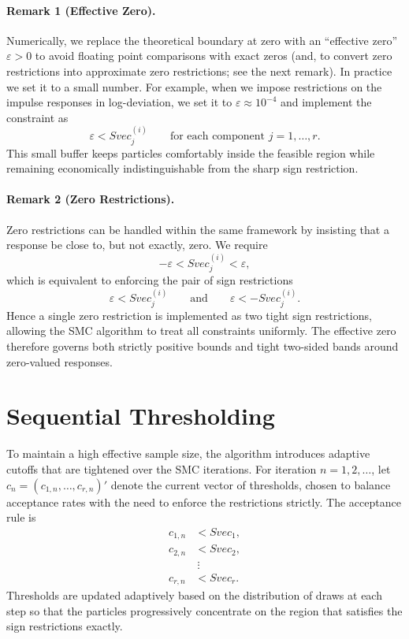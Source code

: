 \documentclass[11pt]{article}
\begin{document}
\paragraph{Remark 1 (Effective Zero).}
Numerically, we replace the theoretical boundary at zero with an ``effective zero'' $\varepsilon>0$ to avoid floating point comparisons with exact zeros (and, to convert zero restrictions into approximate zero restrictions; see the next remark). In practice we set it to a small number. For example, when we impose restrictions on the impulse responses in log-deviation, we set it to $\varepsilon \approx 10^{-4}$ and implement the constraint as
\[
\varepsilon < Svec^{(i)}_j \qquad \text{for each component } j=1,\ldots,r.
\]
This small buffer keeps particles comfortably inside the feasible region while remaining economically indistinguishable from the sharp sign restriction.


\paragraph{Remark 2 (Zero Restrictions).}
Zero restrictions can be handled within the same framework by insisting that a response be close to, but not exactly, zero. We require
\[
-\varepsilon < Svec^{(i)}_j < \varepsilon,
\]
which is equivalent to enforcing the pair of sign restrictions
\[
\varepsilon < Svec^{(i)}_j 
\qquad \text{and} \qquad
\varepsilon < - Svec^{(i)}_j.
\]
Hence a single zero restriction is implemented as two tight sign restrictions, allowing the SMC algorithm to treat all constraints uniformly. The effective zero therefore governs both strictly positive bounds and tight two-sided bands around zero-valued responses.

\section{Sequential Thresholding}
To maintain a high effective sample size, the algorithm introduces adaptive cutoffs that are tightened over the SMC iterations. For iteration $n = 1,2,\ldots$, let $c_{n} = \left(c_{1,n}, \ldots, c_{r,n}\right)'$ denote the current vector of thresholds, chosen to balance acceptance rates with the need to enforce the restrictions strictly. The acceptance rule is
\begin{align*}
c_{1,n} &< Svec_1, \\
c_{2,n} &< Svec_2, \\
&\ \vdots \\
c_{r,n} &< Svec_r.
\end{align*}
Thresholds are updated adaptively based on the distribution of draws at each step so that the particles progressively concentrate on the region that satisfies the sign restrictions exactly.
\end{document}
